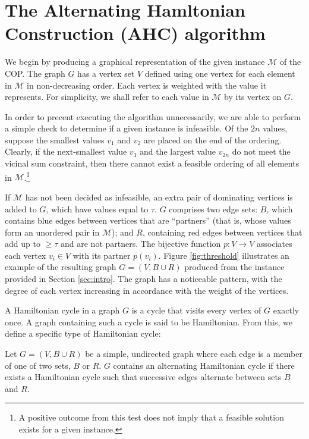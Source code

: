 \documentclass{elsarticle}
\begin{document}

\section{The Alternating Hamltonian Construction (AHC) algorithm}
\label{sec:ahc}
We begin by producing a graphical representation of the given instance $\mathcal{M}$ of the COP. The graph $G$ has a vertex set $V$ defined using one vertex for each element in $\mathcal{M}$ in non-decreasing order. Each vertex is weighted with the value it represents. For simplicity, we shall refer to each value in $\mathcal{M}$ by its vertex on $G$.

In order to precent executing the algorithm unnecessarily, we are able to perform a simple check to determine if a given instance is infeasible. Of the $2n$ values, suppose the smallest values $v_1$ and $v_2$ are placed on the end of the ordering. Clearly, if the next-smallest value $v_3$ and the largest value $v_{2n}$ do not meet the vicinal sum constraint, then there cannot exist a feasible ordering of all elements in $\mathcal{M}$.\footnote{A positive outcome from this test does not imply that a feasible solution exists for a given instance.}

If $\mathcal{M}$ has not been decided as infeasible, an extra pair of dominating vertices is added to $G$, which have values equal to $\tau$. $G$ comprises two edge sets: $B$, which contains blue edges between vertices that are ``partners'' (that is, whose values form an unordered pair in $\mathcal{M}$); and $R$, containing red edges between vertices that add up to $\geq \tau$ and are not partners. The bijective function $p : V \to V$ associates each vertex $v_i \in V$ with its partner $p(v_i)$. Figure \ref{fig:threshold} illustrates an example of the resulting graph $G = (V, B \cup R)$ produced from the instance provided in Section \ref{sec:intro}. The graph has a noticeable pattern, with the degree of each vertex increasing in accordance with the weight of the vertices.

A Hamiltonian cycle in a graph $G$ is a cycle that visits every vertex of $G$ exactly once. A graph containing such a cycle is said to be Hamiltonian. From this, we define a specific type of Hamiltonian cycle:

\begin{definition}
	\label{defn:althamcycle}
	Let $G = (V, B \cup R)$ be a simple, undirected graph where each edge is a member of one of two sets, $B$ or $R$. $G$ contains an alternating Hamiltonian cycle if there exists a Hamiltonian cycle such that successive edges alternate between sets $B$ and $R$.
\end{definition}
\end{document}

